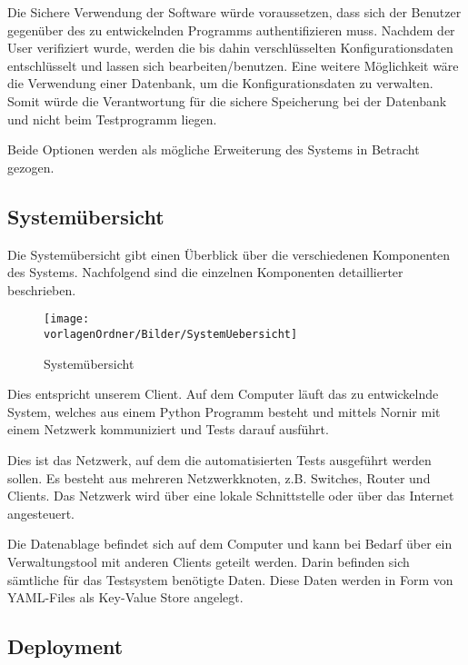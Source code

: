 \documentclass[]{subfiles}
\begin{document}
		Die Sichere Verwendung der Software würde voraussetzen, dass sich der Benutzer gegenüber des zu entwickelnden Programms authentifizieren muss.
		Nachdem der User verifiziert wurde, werden die bis dahin verschlüsselten Konfigurationsdaten entschlüsselt und lassen sich bearbeiten/benutzen.
		Eine weitere Möglichkeit wäre die Verwendung einer Datenbank, um die Konfigurationsdaten zu verwalten. 
		Somit würde die Verantwortung für die sichere Speicherung bei der Datenbank und nicht beim Testprogramm liegen.

		Beide Optionen werden als mögliche Erweiterung des Systems in Betracht gezogen.

    \subsection{Systemübersicht}
        Die Systemübersicht gibt einen Überblick über die verschiedenen Komponenten des Systems. Nachfolgend sind die einzelnen Komponenten detaillierter beschrieben.\\
		\begin{figure}[h!]
			\begin{center}
				\texttt{[image: \\vorlagenOrdner/Bilder/SystemUebersicht]}
			\end{center}
		\caption{Systemübersicht}
		\end{figure}

            Dies entspricht unserem Client.
            Auf dem Computer läuft das zu entwickelnde System, welches aus einem Python Programm besteht und mittels Nornir mit einem Netzwerk kommuniziert und Tests darauf ausführt.

            Dies ist das Netzwerk, auf dem die automatisierten Tests ausgeführt werden sollen. 
            Es besteht aus mehreren Netzwerkknoten, z.B. Switches, Router und Clients.
            Das Netzwerk wird über eine lokale Schnittstelle oder über das Internet angesteuert.

            Die Datenablage befindet sich auf dem Computer und kann bei Bedarf über ein Verwaltungstool mit anderen Clients geteilt werden. 
            Darin befinden sich sämtliche für das Testsystem benötigte Daten.
            Diese Daten werden in Form von YAML-Files als Key-Value Store angelegt.

    \subsection{Deployment}
\end{document}
